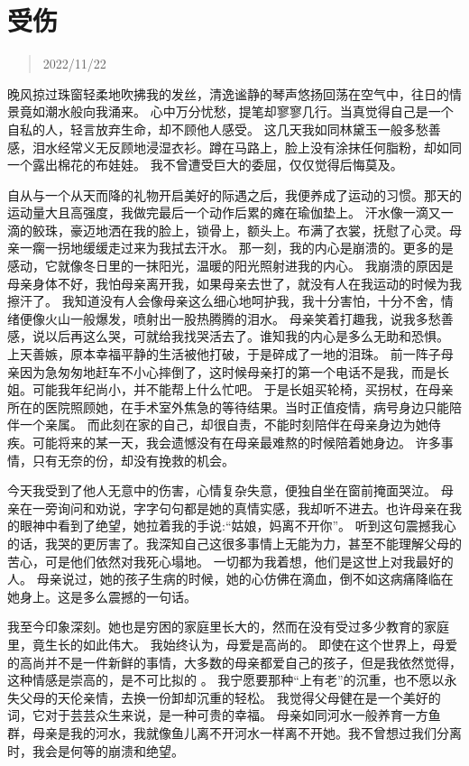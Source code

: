 \documentclass[cn,12pt]{elegantbook}
\begin{document}
\newpage
\section{受伤}
\begin{quotation}
  2022/11/22
\end{quotation}

晚风掠过珠窗轻柔地吹拂我的发丝，清逸谧静的琴声悠扬回荡在空气中，往日的情景竟如潮水般向我涌来。
心中万分忧愁，提笔却寥寥几行。当真觉得自己是一个自私的人，轻言放弃生命，却不顾他人感受。
这几天我如同林黛玉一般多愁善感，泪水经常义无反顾地浸湿衣衫。蹲在马路上，脸上没有涂抹任何脂粉，却如同一个露出棉花的布娃娃。
我不曾遭受巨大的委屈，仅仅觉得后悔莫及。

自从与一个从天而降的礼物开启美好的际遇之后，我便养成了运动的习惯。那天的运动量大且高强度，我做完最后一个动作后累的瘫在瑜伽垫上。
汗水像一滴又一滴的鲛珠，豪迈地洒在我的脸上，锁骨上，额头上。布满了衣裳，抚慰了心灵。母亲一瘸一拐地缓缓走过来为我拭去汗水。
那一刻，我的内心是崩溃的。更多的是感动，它就像冬日里的一抹阳光，温暖的阳光照射进我的内心。
我崩溃的原因是母亲身体不好，我怕母亲离开我，如果母亲去世了，就没有人在我运动的时候为我擦汗了。
我知道没有人会像母亲这么细心地呵护我，我十分害怕，十分不舍，情绪便像火山一般爆发，喷射出一股热腾腾的泪水。
母亲笑着打趣我，说我多愁善感，说以后再这么哭，可就给我找哭活去了。谁知我的内心是多么无助和恐惧。
上天善嫉，原本幸福平静的生活被他打破，于是碎成了一地的泪珠。
前一阵子母亲因为急匆匆地赶车不小心摔倒了，这时候母亲打的第一个电话不是我，而是长姐。可能我年纪尚小，并不能帮上什么忙吧。
于是长姐买轮椅，买拐杖，在母亲所在的医院照顾她，在手术室外焦急的等待结果。当时正值疫情，病号身边只能陪伴一个亲属。
而此刻在家的自己，却很自责，不能时刻陪伴在母亲身边为她侍疾。可能将来的某一天，我会遗憾没有在母亲最难熬的时候陪着她身边。
许多事情，只有无奈的份，却没有挽救的机会。

今天我受到了他人无意中的伤害，心情复杂失意，便独自坐在窗前掩面哭泣。
母亲在一旁询问和劝说，字字句句都是她的真情实感，我却听不进去。也许母亲在我的眼神中看到了绝望，她拉着我的手说:“姑娘，妈离不开你”。
听到这句震撼我心的话，我哭的更厉害了。我深知自己这很多事情上无能为力，甚至不能理解父母的苦心，可是他们依然对我死心塌地。
一切都为我着想，他们是这世上对我最好的人。
母亲说过，她的孩子生病的时候，她的心仿佛在滴血，倒不如这病痛降临在她身上。这是多么震撼的一句话。

我至今印象深刻。她也是穷困的家庭里长大的，然而在没有受过多少教育的家庭里，竟生长的如此伟大。
我始终认为，母爱是高尚的。
即使在这个世界上，母爱的高尚并不是一件新鲜的事情，大多数的母亲都爱自己的孩子，但是我依然觉得，这种情感是崇高的，是不可比拟的 。
我宁愿要那种“上有老”的沉重，也不愿以永失父母的天伦亲情，去换一份卸却沉重的轻松。
我觉得父母健在是一个美好的词，它对于芸芸众生来说，是一种可贵的幸福。
母亲如同河水一般养育一方鱼群，母亲是我的河水，我就像鱼儿离不开河水一样离不开她。我不曾想过我们分离时，我会是何等的崩溃和绝望。
\end{document}
